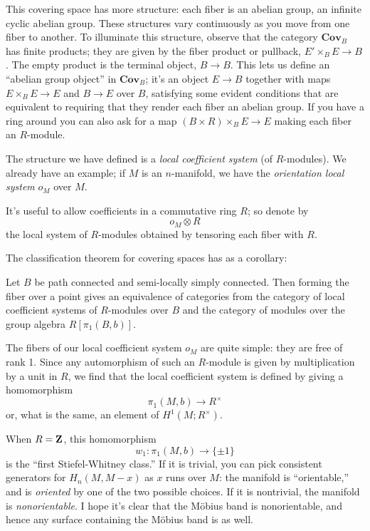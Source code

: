 This covering space has more structure: each fiber is an abelian group,
an infinite cyclic abelian group. These structures vary continuously 
as you move from one fiber to another. To illuminate this structure,
observe that the category $\mathbf{Cov}_B$ has finite products; they are
given by the fiber product or pullback, $E'\times_BE\to B$. The empty
product is the terminal object, $B\to B$. This lets us define an ``abelian
group object'' in $\mathbf{Cov}_B$; it's an object $E\to B$ together with
maps $E\times_BE\to E$ and $B\to E$ over $B$, satisfying some evident
conditions that are equivalent to requiring that they render each fiber
an abelian group. If you have a ring around you can also ask for a map
$(B\times R)\times_BE\to E$ making each fiber an $R$-module. 

The structure we  have defined is a {\em local coefficient system} (of 
$R$-modules). We already have an example; if $M$ is an $n$-manifold, 
we have the {\em orientation local system} $o_M$ over $M$. 

It's useful to allow coefficients in a commutative ring $R$; so denote by
\[
o_M\otimes R
\]
the local system of $R$-modules obtained by tensoring
each fiber with $R$. 

The classification theorem for covering spaces has as a corollary:
\begin{theorem} 
Let $B$ be path connected and semi-locally simply connected.
Then forming the fiber over a point gives an equivalence of categories from
the category of local coefficient systems of $R$-modules over $B$
and the category of modules over the group algebra $R[\pi_1(B,b)]$. 
\end{theorem}

The fibers of our local coefficient system $o_M$ 
are quite simple: they are free of rank 1. Since any 
automorphism of such an $R$-module is given by multiplication by a unit
in $R$, we find that the local coefficient system is defined by 
giving a homomorphism 
\[
\pi_1(M,b)\to R^\times
\]
or, what is the same, an element of $H^1(M;R^\times)$. 

When $R=\mathbf Z$, this homomorphism
\[
w_1:\pi_1(M,b)\to\{\pm1\}
\]
is the ``first Stiefel-Whitney class.'' If it is trivial, you can pick
consistent generators for $H_n(M,M-x)$ as $x$ runs over $M$: the manifold
is ``orientable,'' and is {\em oriented} by one of the two possible choices. 
If it is nontrivial, the manifold is {\em nonorientable}. I hope it's clear
that the M\"obius band is nonorientable, and hence any surface containing
the M\"obius band is as well. 

